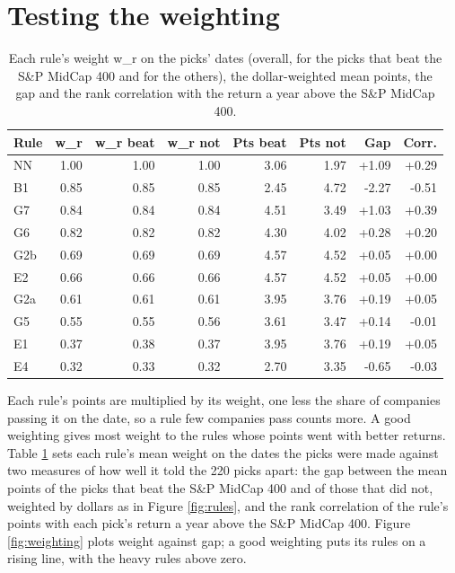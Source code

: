 \documentclass[11pt,a4paper]{article}
\begin{document}
\section{Testing the weighting}
\label{app:weighting}
\begin{table}[H]
\centering
\small
\caption{Each rule's weight w\_r on the picks' dates (overall, for the picks that beat the S\&P MidCap 400 and for the others), the dollar-weighted mean points, the gap and the rank correlation with the return a year above the S\&P MidCap 400.}\label{tab:weighting}
\begin{tabular}{l r r r r r r r}
\hline
Rule & w\_r & w\_r beat & w\_r not & Pts beat & Pts not & Gap & Corr. \\
\hline
NN & 1.00 & 1.00 & 1.00 & 3.06 & 1.97 & +1.09 & +0.29 \\
B1 & 0.85 & 0.85 & 0.85 & 2.45 & 4.72 & -2.27 & -0.51 \\
G7 & 0.84 & 0.84 & 0.84 & 4.51 & 3.49 & +1.03 & +0.39 \\
G6 & 0.82 & 0.82 & 0.82 & 4.30 & 4.02 & +0.28 & +0.20 \\
G2b & 0.69 & 0.69 & 0.69 & 4.57 & 4.52 & +0.05 & +0.00 \\
E2 & 0.66 & 0.66 & 0.66 & 4.57 & 4.52 & +0.05 & +0.00 \\
G2a & 0.61 & 0.61 & 0.61 & 3.95 & 3.76 & +0.19 & +0.05 \\
G5 & 0.55 & 0.55 & 0.56 & 3.61 & 3.47 & +0.14 & -0.01 \\
E1 & 0.37 & 0.38 & 0.37 & 3.95 & 3.76 & +0.19 & +0.05 \\
E4 & 0.32 & 0.33 & 0.32 & 2.70 & 3.35 & -0.65 & -0.03 \\
\hline
\end{tabular}
\end{table}
Each rule's points are multiplied by its weight, one less the share of companies passing it on the date, so a rule few companies pass counts more. A good weighting gives most weight to the rules whose points went with better returns. Table \ref{tab:weighting} sets each rule's mean weight on the dates the picks were made against two measures of how well it told the 220 picks apart: the gap between the mean points of the picks that beat the S\&P MidCap 400 and of those that did not, weighted by dollars as in Figure \ref{fig:rules}, and the rank correlation of the rule's points with each pick's return a year above the S\&P MidCap 400. Figure \ref{fig:weighting} plots weight against gap; a good weighting puts its rules on a rising line, with the heavy rules above zero.
\end{document}
